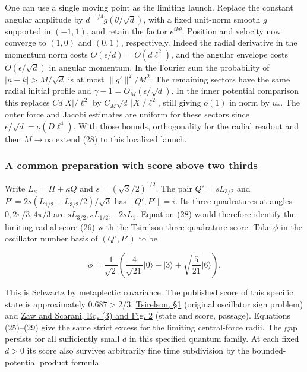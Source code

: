 \documentclass[11pt,a4paper]{article}
\begin{document}
One can use a single moving point as the limiting launch. Replace the
constant angular amplitude by \(d^{-1/4}g(\theta/\sqrt d)\), with a
fixed unit-norm smooth \(g\) supported in \((-1,1)\), and retain the
factor \(e^{ik\theta}\). Position and velocity now converge to \((1,0)\)
and \((0,1)\), respectively. Indeed the radial derivative in the
momentum norm costs \(O(\epsilon/d)=O(d\ell^2)\), and the angular
envelope costs \(O(\epsilon/\sqrt d)\) in angular momentum. In the
Fourier sum the probability of \(|n-k|>M/\sqrt d\) is at most
\(\|g'\|^2/M^2\). The remaining sectors have the same radial initial
profile and \(\gamma-1=O_M(\epsilon/\sqrt d)\). In the inner potential
comparison this replaces \(Cd|X|/\ell^2\) by \(C_M\sqrt d\,|X|/\ell^2\),
still giving \(o(1)\) in norm by \(u_*\). The outer force and Jacobi
estimates are uniform for these sectors since
\(\epsilon/\sqrt d=o(D\ell^4)\). With those bounds, orthogonality for
the radial readout and then \(M\to\infty\) extend (28) to this localized
launch.

\subsubsection{A common preparation with score above two
thirds}\label{a-common-preparation-with-score-above-two-thirds}

Write \(L_\kappa=\Pi+\kappa Q\) and \(s=(\sqrt3/2)^{1/2}\). The pair
\(Q'=sL_{3/2}\) and \(P'=2s(L_{1/2}+L_{3/2}/2)/\sqrt3\) has
\([Q',P']=i\). Its three quadratures at angles \(0,2\pi/3,4\pi/3\) are
\(sL_{3/2},sL_{1/2},-2sL_1\). Equation (28) would therefore identify the
limiting radial score (26) with the Tsirelson three-quadrature score.
Take \(\phi\) in the oscillator number basis of \((Q',P')\) to be

\[
 \phi=\frac1{\sqrt2}\left(\frac4{\sqrt{21}}|0\rangle
          -|3\rangle+\sqrt{\frac5{21}}|6\rangle\right).
\]

This is Schwartz by metaplectic covariance. The published score of this
specific state is approximately \(0.687>2/3\).
\href{https://arxiv.org/pdf/quant-ph/0611147}{Tsirelson, §1} (original
oscillator sign problem) and \href{https://arxiv.org/pdf/2212.06017}{Zaw
and Scarani, Eq. (3) and Fig. 2} (state and score, passage). Equations
(25)--(29) give the same strict excess for the limiting central-force
radii. The gap persists for all sufficiently small \(d\) in this
specified quantum family. At each fixed \(d>0\) its score also survives
arbitrarily fine time subdivision by the bounded-potential product
formula.
\end{document}
